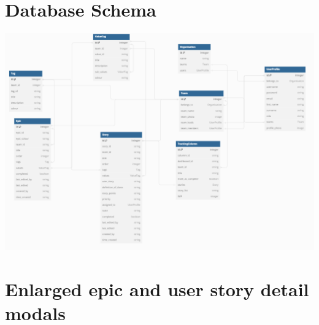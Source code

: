 \documentclass{l4proj}
\begin{document}
\begin{appendices}

\chapter{Database Schema}
\label{app: database}

\centerline{
\includegraphics[width=1.2\textwidth, page=1]{dissertation/appendices/DatabaseDiagram.png}
}

\chapter{Enlarged epic and user story detail modals}
\label{app: epics and us details}


\end{appendices}
\end{document}
